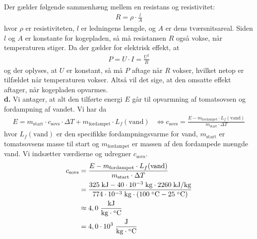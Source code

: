 \documentclass{report}
\begin{document}
Der gælder følgende sammenhæng mellem en resistans og resistivitet:
\begin{equation*}
\begin{split}
R=\rho \cdot \frac{l}{A}
\end{split}
\end{equation*}
hvor $\rho $ er resistiviteten, $l$ er ledningens længde, og $A$ er dens tværsnitsareal. 
Siden $l$ og $A$ er konstante for kogepladen, så må resistansen $R$ også vokse, når temperaturen stiger. 
Da der gælder for elektrisk effekt, at 
\begin{equation*}
\begin{split}
P=U \cdot I=\frac{U^2}{R}
\end{split}
\end{equation*}
og der oplyses, at $U$ er konstant, så må $P$ aftage når $R$ vokser, hvilket netop er tilfældet når temperaturen vokser.
Altså vil det sige, at den omsatte effekt aftager, når kogepladen opvarmes.\\[1ex]
\textbf{d.}
Vi antager, at alt den tilførte energi $E$ går til opvarmning af tomatsovsen og fordampning af vandet.
Vi har da
\begin{equation*}
\begin{split}
E=m_{\text{start} } \cdot c _{\text{sovs} } \cdot \Delta T + m _{\text{fordampet} } \cdot L_f (\text{vand}) &\iff c _{\text{sovs} }=\frac{E-m _{\text{fordampet} } \cdot L_f (\text{vand})}{m _{\text{start} } \cdot \Delta T}
\end{split}
\end{equation*}
hvor $L_f(\text{vand} )$ er den specifikke fordampningsvarme for vand, $m _{\text{start} }$ er tomatsovsens masse til start og $m _{\text{fordampet} }$ er massen af den fordampede mængde vand. 
Vi indsætter værdierne og udregner $c _{\text{sovs} }$.
\begin{equation*}
\begin{split}
c _{\text{sovs} }&=\frac{E-m _{\text{fordampet} } \cdot L_f (\text{vand})}{m _{\text{start} } \cdot \Delta T}\\
&=\frac{325 \;\unit{kJ} - 40 \cdot 10 ^{-3} \;\unit{kg} \cdot 2260 \;\unit{kJ/kg} }{774 \cdot 10 ^{-3}\;\unit{kg} \cdot \left(100 \;\unit{\celsius} - 25 \;\unit{\celsius} \right) }\\
&\approx 4,0 \;\unit{\frac{kJ}{kg \cdot \celsius}} \\
&=4,0 \cdot 10^3 \;\unit{\frac{J}{kg \cdot \celsius}} 
\end{split}
\end{equation*}
\end{document}

